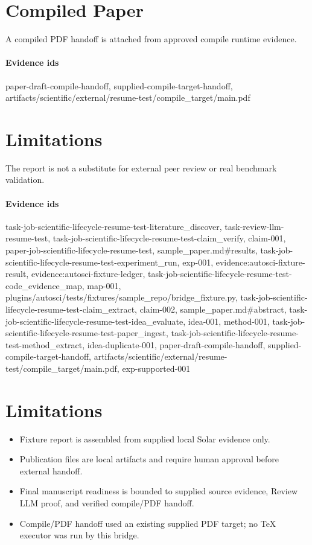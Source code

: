 \documentclass{article}
\begin{document}
\section{Compiled Paper}
A compiled PDF handoff is attached from approved compile runtime evidence.

\paragraph{Evidence ids} paper-draft-compile-handoff, supplied-compile-target-handoff, artifacts/scientific/external/resume-test/compile\_target/main.pdf

\section{Limitations}
The report is not a substitute for external peer review or real benchmark validation.

\paragraph{Evidence ids} task-job-scientific-lifecycle-resume-test-literature\_discover, task-review-llm-resume-test, task-job-scientific-lifecycle-resume-test-claim\_verify, claim-001, paper-job-scientific-lifecycle-resume-test, sample\_paper.md\#results, task-job-scientific-lifecycle-resume-test-experiment\_run, exp-001, evidence:autosci-fixture-result, evidence:autosci-fixture-ledger, task-job-scientific-lifecycle-resume-test-code\_evidence\_map, map-001, plugins/autosci/tests/fixtures/sample\_repo/bridge\_fixture.py, task-job-scientific-lifecycle-resume-test-claim\_extract, claim-002, sample\_paper.md\#abstract, task-job-scientific-lifecycle-resume-test-idea\_evaluate, idea-001, method-001, task-job-scientific-lifecycle-resume-test-paper\_ingest, task-job-scientific-lifecycle-resume-test-method\_extract, idea-duplicate-001, paper-draft-compile-handoff, supplied-compile-target-handoff, artifacts/scientific/external/resume-test/compile\_target/main.pdf, exp-supported-001

\section{Limitations}

\begin{itemize}\item Fixture report is assembled from supplied local Solar evidence only.\end{itemize}
\begin{itemize}\item Publication files are local artifacts and require human approval before external handoff.\end{itemize}
\begin{itemize}\item Final manuscript readiness is bounded to supplied source evidence, Review LLM proof, and verified compile/PDF handoff.\end{itemize}
\begin{itemize}\item Compile/PDF handoff used an existing supplied PDF target; no TeX executor was run by this bridge.\end{itemize}
\end{document}
